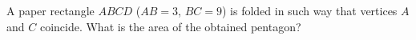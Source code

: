 \problem
A paper rectangle $ABCD$ ($AB = 3$, $BC = 9$) is folded in such way that vertices $A$ and $C$ coincide.
What is the area of the obtained pentagon?
\solution
\endproblem
